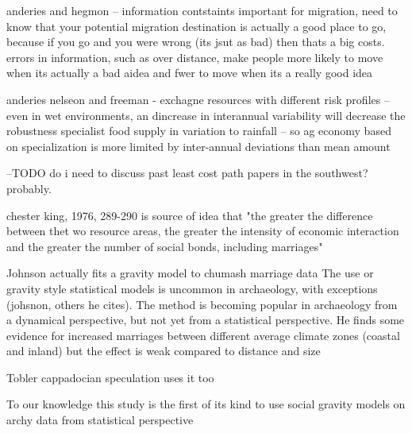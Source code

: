 \documentclass[fleqn,10pt]{wlscirep}
\begin{document}
anderies and hegmon -- information contstaints important for migration, need to know that your potential migration destination is actually a good place to go, because if you go and you were wrong (its jsut as bad) then thats a big costs. errors in information, such as over distance, make people more likely to move when its actually a bad aidea and fwer to move when its a really good idea

anderies nelseon and freeman - exchagne resources with different risk profiles -- even in wet environments, an dincrease in interannual variability will decrease the robustness specialist food supply in variation to rainfall -- so ag economy based on specialization is more limited by inter-annual deviations than mean amount

--TODO do i need to discuss past least cost path papers in the southwest? probably.

chester king, 1976, 289-290 is source of idea that "the greater the difference between thet wo resource areas, the greater the intensity of economic interaction and the greater the number of social bonds, including marriages"

Johnson actually fits a gravity model to chumash marriage data
The use or gravity style statistical models is uncommon in archaeology, with exceptions (johsnon, others he cites). The method is becoming popular in archaeology from a dynamical perspective, but not yet from a statistical perspective.
He finds some evidence for increased marriages between different average climate zones (coastal and inland) but the effect is weak compared to distance and  size

Tobler cappadocian speculation uses it too

To our knowledge this study is the first of its kind to use social gravity models on archy data from statistical perspective
\end{document}
